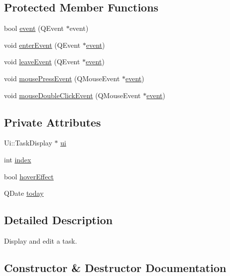 \subsection*{Protected Member Functions}
\begin{DoxyCompactItemize}
\item 
bool \hyperlink{classTaskDisplay_a32caa0a9768c26e08864a46fe128ed74}{event} (Q\+Event $\ast$event)
\item 
void \hyperlink{classTaskDisplay_a6c59096df7c96c3bd3dfbc79df9a5712}{enter\+Event} (Q\+Event $\ast$\hyperlink{classTaskDisplay_a32caa0a9768c26e08864a46fe128ed74}{event})
\item 
void \hyperlink{classTaskDisplay_ac88db0d1766d9eb4b622cbfeb701fcc7}{leave\+Event} (Q\+Event $\ast$\hyperlink{classTaskDisplay_a32caa0a9768c26e08864a46fe128ed74}{event})
\item 
void \hyperlink{classTaskDisplay_a6c488759b6e70862f2138aa55262aaaf}{mouse\+Press\+Event} (Q\+Mouse\+Event $\ast$\hyperlink{classTaskDisplay_a32caa0a9768c26e08864a46fe128ed74}{event})
\item 
void \hyperlink{classTaskDisplay_a5c604068075246ce7f60d6e6432da284}{mouse\+Double\+Click\+Event} (Q\+Mouse\+Event $\ast$\hyperlink{classTaskDisplay_a32caa0a9768c26e08864a46fe128ed74}{event})
\end{DoxyCompactItemize}
\subsection*{Private Attributes}
\begin{DoxyCompactItemize}
\item 
Ui\+::\+Task\+Display $\ast$ \hyperlink{classTaskDisplay_a580ecd014e47a399bf6416fa31aff7da}{ui}
\item 
int \hyperlink{classTaskDisplay_a59c27396e432f0d65d4988aa917edb28}{index}
\item 
bool \hyperlink{classTaskDisplay_a1dcd9193b35d30e1321515e7d9aded08}{hover\+Effect}
\item 
Q\+Date \hyperlink{classTaskDisplay_a1adb50384f7db484b7f35c8952395157}{today}
\end{DoxyCompactItemize}


\subsection{Detailed Description}
Display and edit a task. 

\subsection{Constructor \& Destructor Documentation}
